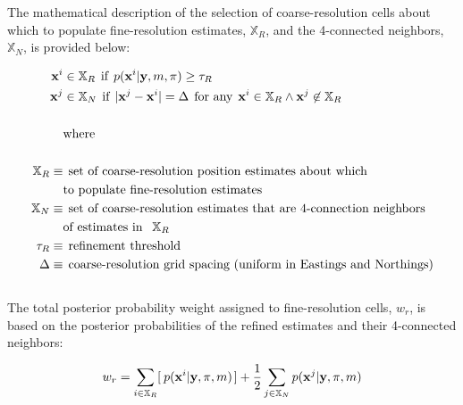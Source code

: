 The mathematical description of the selection of coarse-resolution cells about which to populate fine-resolution estimates, $\mathbb{X}_R$, and the 4-connected neighbors, $\mathbb{X}_N$, is provided below:

\begin{align}
\begin{split}
\mathbf{x}^{i} &\in \mathbb{X}_R \hspace{1ex} \text{if} \hspace{1ex} p(\mathbf{x}^{i} | \mathbf{y}, m, \pi) \geq \tau_{R} \\
\mathbf{x}^{j} &\in \mathbb{X}_N \hspace{1ex} \text{if} \hspace{1ex} | \mathbf{x}^{j} - \mathbf{x}^{i} | = \Delta \hspace{1ex} \text{for any} \hspace{1ex} \mathbf{x}^{i} \in \mathbb{X} _R \wedge \mathbf{x}^{j} \not \in \mathbb{X}_R\\ \\
&\text{where} \\ \\
\mathbb{X}_R \equiv &\hspace{1ex}\text{set of coarse-resolution position estimates about which} \\
& \text{to populate fine-resolution estimates} \\
\mathbb{X}_N \equiv &\hspace{1ex}\text{set of coarse-resolution estimates that are 4-connection neighbors} \\ 
&\text{of estimates in } \hspace{1ex} \mathbb{X}_R \\
\tau_R \equiv &\hspace{1ex}\text{refinement threshold} \\
\Delta \equiv &\hspace{1ex}\text{coarse-resolution grid spacing (uniform in Eastings and Northings)} \\
\end{split}
\label{eq:Sets}
\end{align}
\\

The total posterior probability weight assigned to fine-resolution cells, $w_r$, is based on the posterior probabilities of the refined estimates and their 4-connected neighbors:

\begin{align}
\begin{split}
w_r &= \sum_{i \in \mathbb{X}_R} [\hspace{0.5ex} p(\mathbf{x}^{i} | \mathbf{y}, \mathbf{\pi}, m) \hspace{0.3ex}] + \frac{1}{2} \sum_{j \in \mathbb{X}_N}  p(\mathbf{x}^{j} | \mathbf{y}, \mathbf{\pi}, m) \\
\end{split}
\label{eq:refineWeights}
\end{align}

